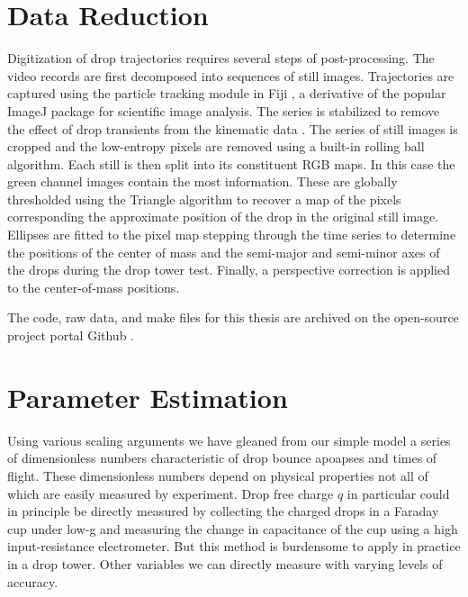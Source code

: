 \documentclass[12pt,a4paper,oneside]{book}
\begin{document}
\section{Data Reduction}
Digitization of drop trajectories requires several steps of post-processing. The video records are first decomposed into sequences of still images. Trajectories are captured using the particle tracking module in Fiji \cite{schindelin_fiji:_2012}, a derivative of the popular ImageJ \cite{schneider_nih_2012} package for scientific image analysis. The series is stabilized to remove the effect of drop transients from the kinematic data \cite{li_image_2008}. The series of still images is cropped and the low-entropy pixels are removed using a built-in rolling ball algorithm. Each still is then split into its constituent RGB maps. In this case the green channel images contain the most information. These are globally thresholded using the Triangle algorithm to recover a map of the pixels corresponding the approximate position of the drop in the original still image. Ellipses are fitted to the pixel map stepping through the time series to determine the positions of the center of mass and the semi-major and semi-minor axes of the drops during the drop tower test. Finally, a perspective correction is applied to the center-of-mass positions. 

The code, raw data, and make files for this thesis are archived on the open-source project portal Github \cite{schmidt_droplet_electro-bounce:_2017}.

\section{Parameter Estimation}
Using various scaling arguments we have gleaned from our simple model a series of dimensionless numbers characteristic of drop bounce apoapses and times of flight. These dimensionless numbers depend on physical properties not all of which are easily measured by experiment. Drop free charge $q$ in particular could in principle be directly measured by collecting the charged drops in a Faraday cup under low-g and measuring the change in capacitance of the cup using a high input-resistance electrometer. But this method is burdensome to apply in practice in a drop tower. Other variables we can directly measure with varying levels of accuracy. 
\end{document}
